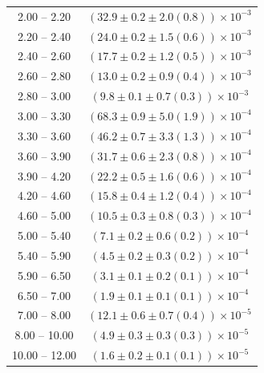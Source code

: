 \begin{table}
\begin{center}
\begin{tabular}{ c | c }
2.00 -- 2.20 & $(32.9\pm0.2\pm2.0(0.8))\times10^{-3}$ \\ 
2.20 -- 2.40 & $(24.0\pm0.2\pm1.5(0.6))\times10^{-3}$ \\ 
2.40 -- 2.60 & $(17.7\pm0.2\pm1.2(0.5))\times10^{-3}$ \\ 
2.60 -- 2.80 & $(13.0\pm0.2\pm0.9(0.4))\times10^{-3}$ \\ 
2.80 -- 3.00 & $(9.8\pm0.1\pm0.7(0.3))\times10^{-3}$ \\ 
3.00 -- 3.30 & $(68.3\pm0.9\pm5.0(1.9))\times10^{-4}$ \\ 
3.30 -- 3.60 & $(46.2\pm0.7\pm3.3(1.3))\times10^{-4}$ \\ 
3.60 -- 3.90 & $(31.7\pm0.6\pm2.3(0.8))\times10^{-4}$ \\ 
3.90 -- 4.20 & $(22.2\pm0.5\pm1.6(0.6))\times10^{-4}$ \\ 
4.20 -- 4.60 & $(15.8\pm0.4\pm1.2(0.4))\times10^{-4}$ \\ 
4.60 -- 5.00 & $(10.5\pm0.3\pm0.8(0.3))\times10^{-4}$ \\ 
5.00 -- 5.40 & $(7.1\pm0.2\pm0.6(0.2))\times10^{-4}$ \\ 
5.40 -- 5.90 & $(4.5\pm0.2\pm0.3(0.2))\times10^{-4}$ \\ 
5.90 -- 6.50 & $(3.1\pm0.1\pm0.2(0.1))\times10^{-4}$ \\ 
6.50 -- 7.00 & $(1.9\pm0.1\pm0.1(0.1))\times10^{-4}$ \\ 
7.00 -- 8.00 & $(12.1\pm0.6\pm0.7(0.4))\times10^{-5}$ \\ 
8.00 -- 10.00 & $(4.9\pm0.3\pm0.3(0.3))\times10^{-5}$ \\ 
10.00 -- 12.00 & $(1.6\pm0.2\pm0.1(0.1))\times10^{-5}$ \\ 
\hline
\end{tabular}
\end{center}
\end{table}
 
